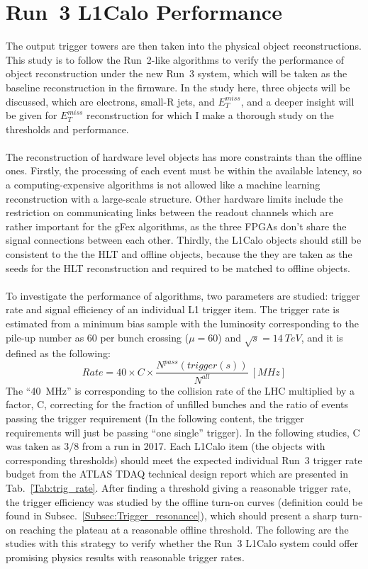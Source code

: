 \section{Run~3 L1Calo Performance}
\label{Sec:Trig_obj}
The output trigger towers are then taken into the physical object reconstructions. This study is to follow the Run~2-like algorithms to verify the performance of object reconstruction under the new Run~3 system, which will be taken as the baseline reconstruction in the firmware. In the study here, three objects will be discussed, which are electrons, small-R jets, and $E^{miss}_{T}$, and a deeper insight will be given for $E^{miss}_{T}$ reconstruction for which I make a thorough study on the thresholds and performance. 
\\
\\The reconstruction of hardware level objects has more constraints than the offline ones. Firstly, the processing of each event must be within the available latency, so a computing-expensive algorithms is not allowed like a machine learning reconstruction with a large-scale structure. Other hardware limits include the restriction on communicating links between the readout channels which are rather important for the gFex algorithms, as the three FPGAs don't share the signal connections between each other. Thirdly, the L1Calo objects should still be consistent to the the HLT and offline objects, because the they are taken as the seeds for the HLT reconstruction and required to be matched to offline objects. 
\\
\\To investigate the performance of algorithms, two parameters are studied: trigger rate and signal efficiency of an individual L1 trigger item. The trigger rate is estimated from a minimum bias sample with the luminosity corresponding to the pile-up number as 60 per bunch crossing ($\mu=60$) and $\sqrt{s}=14~TeV$, and it is defined as the following:
\begin{equation}
Rate = 40\times C\times\frac{N^{pass}(trigger(s))}{N^{all}}~[MHz]
\end{equation} 
The ``40~MHz'' is corresponding to the collision rate of the LHC multiplied by a factor, C, correcting for the fraction of unfilled bunches and the ratio of events passing the trigger requirement (In the following content, the trigger requirements will just be passing ``one single'' trigger). In the following studies, C was taken as $3/8$ from a run in 2017. Each L1Calo item (the objects with corresponding thresholds) should meet the expected individual Run~3 trigger rate budget from the ATLAS TDAQ technical design report\cite{Aad:1602235} which are presented in Tab.~\ref{Tab:trig_rate}. After finding a threshold giving a reasonable trigger rate, the trigger efficiency was studied by the offline turn-on curves (definition could be found in Subsec.~\ref{Subsec:Trigger_resonance}), which should present a sharp turn-on reaching the plateau at a reasonable offline threshold. The following are the studies with this strategy to verify whether the Run~3 L1Calo system could offer promising physics results with reasonable trigger rates. 
